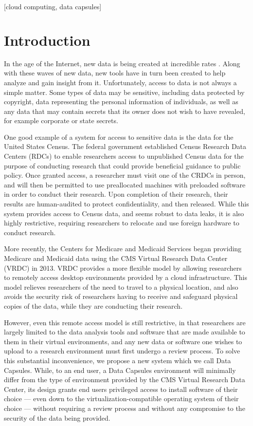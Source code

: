 \documentclass{acm_proc_article-sp}
\begin{document}
[cloud computing, data capsules]


\section{Introduction}

In the age of the Internet, new data is being created at incredible rates
\cite{digital-universe}.  Along with these waves of new data, new tools have
in turn been created to help analyze and gain insight from it. Unfortunately,
access to data is not always a simple matter.  Some types of data may be
sensitive, including data protected by copyright, data representing the personal
information of individuals, as well as any data that may contain secrets that
its owner does not wish to have revealed, for example corporate or state secrets.

One good example of a system for access to sensitive data is the data for the
United States Census.  The federal government established Census Research Data
Centers (RDCs) to enable researchers access to unpublished Census data for the
purpose of conducting research that could provide beneficial guidance to public
policy.  Once granted access, a researcher must visit one of the CRDCs in
person, and will then be permitted to use preallocated machines with preloaded
software in order to conduct their research.  Upon completion of their research,
their results are human-audited to protect confidentiality, and then released.
While this system provides access to Census data, and seems robust to data
leaks, it is also highly restrictive, requiring researchers to relocate and use
foreign hardware to conduct research.

More recently, the Centers for Medicare and Medicaid Services began providing
Medicare and Medicaid data using the CMS Virtual Research Data Center (VRDC) in
2013.  VRDC provides a more flexible model by allowing researchers to remotely
access desktop environments provided by a cloud infrastructure.  This model
relieves researchers of the need to travel to a physical location, and also
avoids the security risk of researchers having to receive and safeguard physical
copies of the data, while they are conducting their research.

However, even this remote access model is still restrictive, in that researchers
are largely limited to the data analysis tools and software that are made
available to them in their virtual environments, and any new data or software
one wishes to upload to a research environment must first undergo a review
process. To solve this substantial inconvenience, we propose a new system which
we call Data Capsules.  While, to an end user, a Data Capsules environment will
minimally differ from the type of environment provided by the CMS Virtual
Research Data Center, its design grants end users privileged access to install
software of their choice --- even down to the virtualization-compatible
operating system of their choice --- without requiring a review process and
without any compromise to the security of the data being provided.
\end{document}
